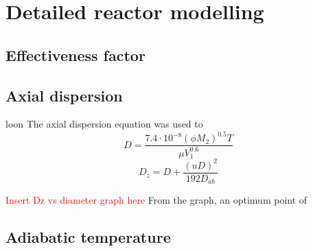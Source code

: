 \section{Detailed reactor modelling}
\subsection{Effectiveness factor}

\subsection{Axial dispersion}
loon
The axial dispersion equation was used to 
\begin{equation}
    D=\frac{7.4\cdot10^{-8}(\phi M_2)^{0.5}T}{\mu V_1^{0.6}}
    \label{wilkechang}
\end{equation}
\begin{equation}
    D_z=D+\frac{(uD)^2}{192D_{ab}}
    \label{axial dispersion coefficient}
\end{equation}

\textcolor{red}{Insert Dz vs diameter graph here} 
From the graph, an optimum point of 
\subsection{Adiabatic temperature}